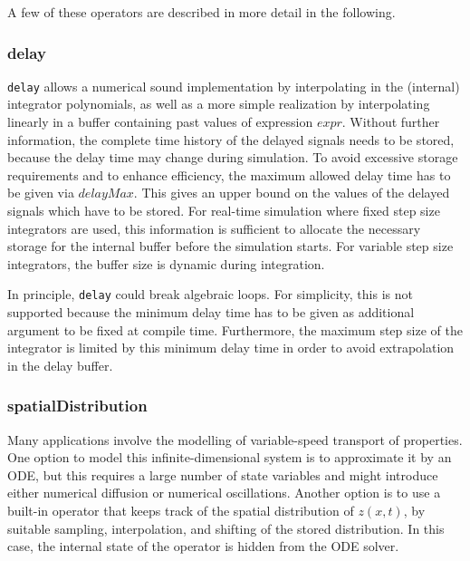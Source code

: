 A few of these operators are described in more detail in the following.

\subsubsection{delay}\label{delay}

\begin{nonnormative}
\lstinline!delay! allows a numerical sound implementation by interpolating in the (internal) integrator polynomials, as well as a more simple realization by interpolating linearly in a buffer containing past values of expression $\mathit{expr}$.
Without further information, the complete time history of the delayed signals needs to be stored, because the delay time may change during simulation.
To avoid excessive storage requirements and to enhance efficiency, the maximum allowed delay time has to be given via $\mathit{delayMax}$.
This gives an upper bound on the values of the delayed signals which have to be stored.
For real-time simulation where fixed step size integrators are used, this information is sufficient to allocate the necessary storage for the internal buffer before the simulation starts.
For variable step size integrators, the buffer size is dynamic during integration.

In principle, \lstinline!delay! could break algebraic loops.
For simplicity, this is not supported because the minimum delay time has to be given as additional argument to be fixed at compile time.
Furthermore, the maximum step size of the integrator is limited by this minimum delay time in order to avoid extrapolation in the delay buffer.
\end{nonnormative}

\subsubsection{spatialDistribution}\label{spatialdistribution}

\begin{nonnormative}
Many applications involve the modelling of variable-speed transport of properties.
One option to model this infinite-dimensional system is to approximate it by an ODE, but this requires a large number of state variables and might introduce either numerical diffusion or numerical oscillations.
Another option is to use a built-in operator that keeps track of the spatial distribution of $z(x, t)$, by suitable sampling, interpolation, and shifting of the stored distribution.
In this case, the internal state of the operator is hidden from the ODE solver.
\end{nonnormative}

